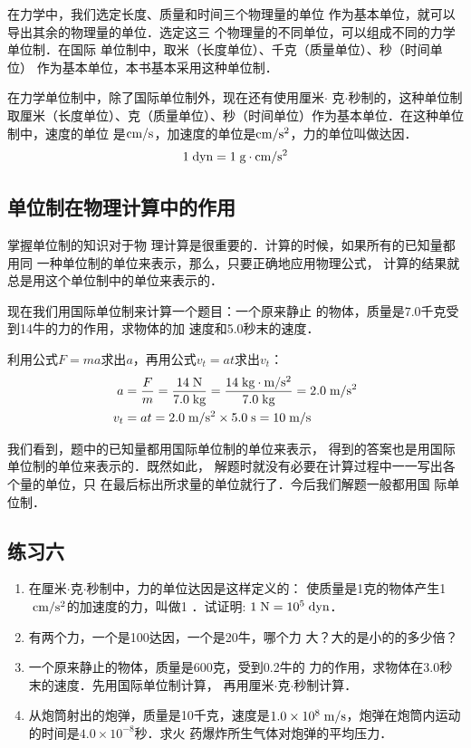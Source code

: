 在力学中，我们选定长度、质量和时间三个物理量的单位
作为基本单位，就可以导出其余的物理量的单位．选定这三
个物理量的不同单位，可以组成不同的力学单位制．在国际
单位制中，取米（长度单位）、千克（质量单位）、秒（时间单位）
作为基本单位，本书基本采用这种单位制．

在力学单位制中，除了国际单位制外，现在还有使用厘米$\cdot$
克$\cdot$秒制的，这种单位制取厘米（长度单位）、克（质量单位）、秒（时间单位）作为基本单位．在这种单位制中，速度的单位
是$\text{cm}/\text{s}$，加速度的单位是$\text{cm}/\text{s}^2$，力的单位叫做达因．
\[1 \;\text{dyn} =1 \;\text{g}\cdot \text{cm}/\text{s}^2  \]


\subsection{单位制在物理计算中的作用}
掌握单位制的知识对于物
理计算是很重要的．计算的时候，如果所有的已知量都用同
一种单位制的单位来表示，那么，只要正确地应用物理公式，
计算的结果就总是用这个单位制中的单位来表示的．

现在我们用国际单位制来计算一个题目：一个原来静止
的物体，质量是7.0千克受到14牛的力的作用，求物体的加
速度和5.0秒末的速度．

利用公式$F= ma$求出$a$，再用公式$v_t= at$求出$v_t$：
\[\begin{split}
a&=\frac{F}{m}=\frac{14 \;\text{N}}{7.0\;\text{kg}}=\frac{14\;\text{kg}\cdot \text{m}/\text{s}^2}{7.0\;\text{kg}}=2.0\;\text{m}/\text{s}^2\\
v_t&=at=2.0\;\text{m}/\text{s}^2 \times 5.0\;\text{s}=10\;\text{m}/\text{s}
\end{split} \]

我们看到，题中的已知量都用国际单位制的单位来表示，
得到的答案也是用国际单位制的单位来表示的．既然如此，
解题时就没有必要在计算过程中一一写出各个量的单位，只
在最后标出所求量的单位就行了．今后我们解题一般都用国
际单位制．


\subsection*{练习六}
\begin{enumerate}
\item 在厘米$\cdot$克$\cdot$秒制中，力的单位达因是这样定义的：
使质量是1克的物体产生1$\;\text{cm}/\text{s}^2$的加速度的力，叫做1
．试证明: $1\;\text{N}=10^5\;\text{dyn}$．
\item 有两个力，一个是100达因，一个是20牛，哪个力
大？大的是小的的多少倍？
\item 一个原来静止的物体，质量是600克，受到0.2牛的
力的作用，求物体在3.0秒末的速度．先用国际单位制计算，
再用厘米$\cdot$克$\cdot$秒制计算．
\item 从炮筒射出的炮弹，质量是10千克，速度是$1.0\times 
10^8\;\text{m}/\text{s}$，炮弹在炮筒内运动的时间是$4.0\times 10^{-8}$秒．求火
药爆炸所生气体对炮弹的平均压力．

\end{enumerate}

